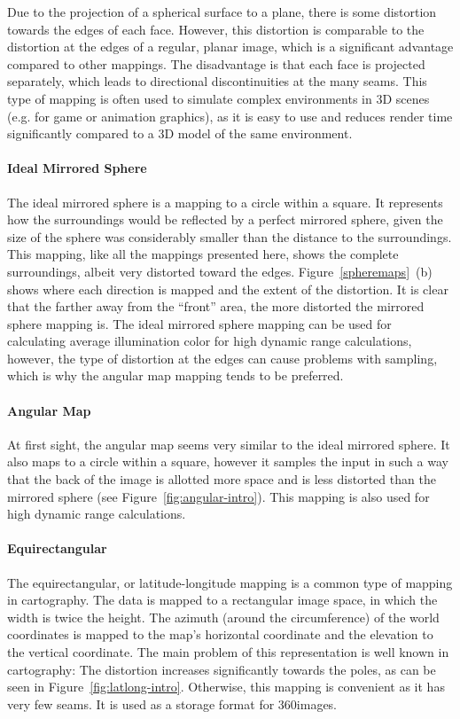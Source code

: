 Due to the projection of a spherical surface to a plane, there is some distortion towards the edges of each face. However, this distortion is comparable to the distortion at the edges of a regular, planar image, which is a significant advantage compared to other mappings. The disadvantage is that each face is projected separately, which leads to directional discontinuities at the many seams. This type of mapping is often used to simulate complex environments in 3D scenes (e.g. for game or animation graphics), as it is easy to use and reduces render time significantly compared to a 3D model of the same environment.
\cite{hdrbook}

\paragraph{Ideal Mirrored Sphere}
The ideal mirrored sphere is a mapping to a circle within a square. It represents how the surroundings would be reflected by a perfect mirrored sphere, given the size of the sphere was considerably smaller than the distance to the surroundings. This mapping, like all the mappings presented here, shows the complete surroundings, albeit very distorted toward the edges. Figure~\ref{spheremaps}~(b) shows where each direction is mapped and the extent of the distortion. It is clear that the farther away from the ``front'' area, the more distorted the mirrored sphere mapping is. The ideal mirrored sphere mapping can be used for calculating average illumination color for high dynamic range calculations, however, the type of distortion at the edges can cause problems with sampling, which is why the angular map mapping tends to be preferred.
\cite{hdrbook}

\paragraph{Angular Map}
At first sight, the angular map seems very similar to the ideal mirrored sphere. It also maps to a circle within a square, however it samples the input in such a way that the back of the image is allotted more space and is less distorted than the mirrored sphere (see Figure~\ref{fig:angular-intro}). This mapping is also used for high dynamic range calculations.

\paragraph{Equirectangular}
The equirectangular, or latitude-longitude mapping is a common type of mapping in cartography. The data is mapped to a rectangular image space, in which the width is twice the height. The azimuth (around the circumference) of the world coordinates is mapped to the map's horizontal coordinate and the elevation to the vertical coordinate. The main problem of this representation is well known in cartography: The distortion increases significantly towards the poles, as can be seen in Figure~\ref{fig:latlong-intro}. Otherwise, this mapping is convenient as it has very few seams. It is used as a storage format for 360\degree images.

